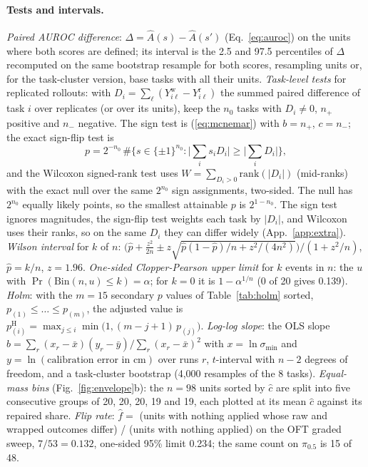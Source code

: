 \documentclass{article}
\newcommand{\pihalf}{$\pi_{0.5}$}
\begin{document}
\paragraph{Tests and intervals.} \emph{Paired AUROC difference}: $\Delta = \widehat A(s) - \widehat A(s')$
(Eq.~\ref{eq:auroc}) on the units where both scores are defined; its interval is the 2.5 and 97.5 percentiles of
$\Delta$ recomputed on the same bootstrap resample for both scores, resampling units or, for the task-cluster version,
base tasks with all their units. \emph{Task-level tests} for replicated rollouts: with $D_i = \sum_\ell (Y^{\mathrm
w}_{i\ell} - Y^{\mathrm r}_{i\ell})$ the summed paired difference of task $i$ over replicates (or over its units), keep
the $n_0$ tasks with $D_i \ne 0$, $n_+$ positive and $n_-$ negative. The sign test is (\ref{eq:mcnemar}) with $b = n_+$,
$c = n_-$; the exact sign-flip test is
\begin{equation}
p = 2^{-n_0}\, \#\Big\{ s \in \{\pm1\}^{n_0} : \Big|\sum_i s_i D_i\Big| \ge \Big|\sum_i D_i\Big| \Big\},
\label{eq:signflip}
\end{equation}
and the Wilcoxon signed-rank test uses $W = \sum_{D_i > 0} \mathrm{rank}(|D_i|)$ (mid-ranks) with the exact null over
the same $2^{n_0}$ sign assignments, two-sided. The null has $2^{n_0}$ equally likely points, so the smallest attainable
$p$ is $2^{1-n_0}$. The sign test ignores magnitudes, the sign-flip test weights each task by $|D_i|$, and Wilcoxon uses
their ranks, so on the same $D_i$ they can differ widely (App.~\ref{app:extra}). \emph{Wilson interval} for $k$ of $n$:
$\big(\hat p + \tfrac{z^2}{2n} \pm z\sqrt{\hat p(1-\hat p)/n + z^2/(4n^2)}\big)/(1 + z^2/n)$, $\hat p = k/n$, $z = 1.96$.
\emph{One-sided Clopper-Pearson upper limit} for $k$ events in $n$: the $u$ with $\Pr(\mathrm{Bin}(n,u) \le k) = \alpha$;
for $k = 0$ it is $1 - \alpha^{1/n}$ (0 of 20 gives 0.139). \emph{Holm}: with the $m = 15$ secondary $p$ values of
Table~\ref{tab:holm} sorted, $p_{(1)} \le \dots \le p_{(m)}$, the adjusted value is $p^{\mathrm H}_{(i)} = \max_{j \le i}
\min\big(1, (m - j + 1)\,p_{(j)}\big)$. \emph{Log-log slope}: the OLS slope $\hat b = \sum_r (x_r - \bar x)(y_r - \bar
y)/\sum_r (x_r - \bar x)^2$ with $x = \ln \sigma_{\min}$ and $y = \ln(\text{calibration error in cm})$ over runs $r$,
$t$-interval with $n - 2$ degrees of freedom, and a task-cluster bootstrap (4{,}000 resamples of the 8 tasks).
\emph{Equal-mass bins} (Fig.~\ref{fig:envelope}b): the $n = 98$ units sorted by $\hat c$ are split into five
consecutive groups of 20, 20, 20, 19 and 19, each plotted at its mean $\hat c$ against its repaired share.
\emph{Flip rate}: $\hat f = $ (units with nothing applied whose raw and wrapped outcomes differ) / (units with nothing
applied) on the OFT graded sweep, $7/53 = 0.132$, one-sided 95\% limit 0.234; the same count on \pihalf{} is 15 of 48.
\end{document}
